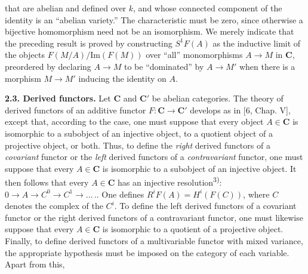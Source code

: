 
\noindent that are abelian and defined over $k$, and whose connected component
of the identity is an ``abelian variety.'' The characteristic must be zero,
since otherwise a bijective homomorphism need not be an isomorphism. We merely
indicate that the preceding result is proved by constructing $S^1F(A)$ as the
inductive limit of the objects $F(M/A)/\mathrm{Im}(F(M))$ over ``all''
monomorphisms $A\to M$ in $\mathbf{C}$, preordered by declaring
$A\to M$ to be ``dominated'' by $A\to M'$ when there
is a morphism $M\to M'$ inducing the identity on $A$.

\indent\textbf{2.3. Derived functors.} Let $\mathbf{C}$ and $\mathbf{C}'$ be abelian
categories. The theory of derived functors of an additive functor
$F:\mathbf{C}\to \mathbf{C}'$ develops as in [6, Chap. V], except that, according
to the case, one must suppose that every object $A\in \mathbf{C}$ is isomorphic to a
subobject of an injective object, to a quotient object of a projective object,
or both.
Thus, to define the \textit{right} derived functors of a \textit{covariant} functor or the \textit{left}
derived functors of a \textit{contravariant} functor, one must suppose that every
$A\in \mathbf{C}$ is isomorphic to a subobject of an injective object. It then follows
that every $A\in \mathbf{C}$ has an injective resolution\textsuperscript{3)}:
$0\to A\to C^0\to C^1\to
\ldots\,.$. One defines
$R^iF(A)=H^i(F(C))$, where $C$ denotes the complex of the $C^i$. To define
the left derived functors of a covariant functor or the right derived functors
of a contravariant functor, one must likewise suppose that every $A\in \mathbf{C}$ is
isomorphic to a quotient of a projective object. Finally, to define derived
functors of a multivariable functor with mixed variance, the appropriate
hypothesis must be imposed on the category of each variable. Apart from this,
